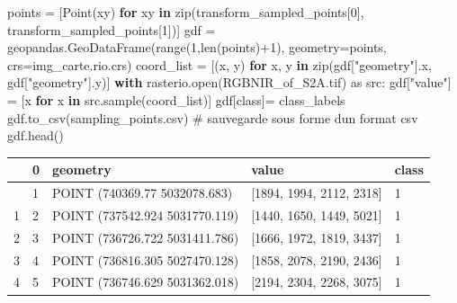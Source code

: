 \documentclass[
  french,
  11pt,
  letterpaper,
  open=any,
  twoside=false,
  french]{scrbook}
\newenvironment{Shaded}{\begin{snugshade}}{\end{snugshade}}
\newcommand{\BuiltInTok}[1]{\textcolor[rgb]{0.00,0.23,0.31}{#1}}
\newcommand{\CommentTok}[1]{\textcolor[rgb]{0.37,0.37,0.37}{#1}}
\newcommand{\ControlFlowTok}[1]{\textcolor[rgb]{0.00,0.23,0.31}{\textbf{#1}}}
\newcommand{\DecValTok}[1]{\textcolor[rgb]{0.68,0.00,0.00}{#1}}
\newcommand{\ImportTok}[1]{\textcolor[rgb]{0.00,0.46,0.62}{#1}}
\newcommand{\KeywordTok}[1]{\textcolor[rgb]{0.00,0.23,0.31}{\textbf{#1}}}
\newcommand{\NormalTok}[1]{\textcolor[rgb]{0.00,0.23,0.31}{#1}}
\newcommand{\OperatorTok}[1]{\textcolor[rgb]{0.37,0.37,0.37}{#1}}
\newcommand{\StringTok}[1]{\textcolor[rgb]{0.13,0.47,0.30}{#1}}
\newcounter{none} %
\begin{document}
\begin{Shaded}
\begin{Highlighting}[]
\NormalTok{points }\OperatorTok{=}\NormalTok{ [Point(xy) }\ControlFlowTok{for}\NormalTok{ xy }\KeywordTok{in} \BuiltInTok{zip}\NormalTok{(transform\_sampled\_points[}\DecValTok{0}\NormalTok{], transform\_sampled\_points[}\DecValTok{1}\NormalTok{])]}
\NormalTok{gdf }\OperatorTok{=}\NormalTok{ geopandas.GeoDataFrame(}\BuiltInTok{range}\NormalTok{(}\DecValTok{1}\NormalTok{,}\BuiltInTok{len}\NormalTok{(points)}\OperatorTok{+}\DecValTok{1}\NormalTok{), geometry}\OperatorTok{=}\NormalTok{points, crs}\OperatorTok{=}\NormalTok{img\_carte.rio.crs)}
\NormalTok{coord\_list }\OperatorTok{=}\NormalTok{ [(x, y) }\ControlFlowTok{for}\NormalTok{ x, y }\KeywordTok{in} \BuiltInTok{zip}\NormalTok{(gdf[}\StringTok{"geometry"}\NormalTok{].x, gdf[}\StringTok{"geometry"}\NormalTok{].y)]}
\ControlFlowTok{with}\NormalTok{ rasterio.}\BuiltInTok{open}\NormalTok{(}\StringTok{\textquotesingle{}RGBNIR\_of\_S2A.tif\textquotesingle{}}\NormalTok{) }\ImportTok{as}\NormalTok{ src:}
\NormalTok{  gdf[}\StringTok{"value"}\NormalTok{] }\OperatorTok{=}\NormalTok{ [x }\ControlFlowTok{for}\NormalTok{ x }\KeywordTok{in}\NormalTok{ src.sample(coord\_list)]}
\NormalTok{gdf[}\StringTok{\textquotesingle{}class\textquotesingle{}}\NormalTok{]}\OperatorTok{=}\NormalTok{ class\_labels}
\NormalTok{gdf.to\_csv(}\StringTok{\textquotesingle{}sampling\_points.csv\textquotesingle{}}\NormalTok{) }\CommentTok{\# sauvegarde sous forme d\textquotesingle{}un format csv}
\NormalTok{gdf.head()}
\end{Highlighting}
\end{Shaded}

{\def\LTcaptype{none} %
\begin{longtable}[]{@{}lllll@{}}
\toprule\noalign{}
& 0 & geometry & value & class \\
\midrule\noalign{}
\endhead
\bottomrule\noalign{}
\endlastfoot
0 & 1 & POINT (740369.77 5032078.683) & {[}1894, 1994, 2112, 2318{]} &
1 \\
1 & 2 & POINT (737542.924 5031770.119) & {[}1440, 1650, 1449, 5021{]} &
1 \\
2 & 3 & POINT (736726.722 5031411.786) & {[}1666, 1972, 1819, 3437{]} &
1 \\
3 & 4 & POINT (736816.305 5027470.128) & {[}1858, 2078, 2190, 2436{]} &
1 \\
4 & 5 & POINT (736746.629 5031362.018) & {[}2194, 2304, 2268, 3075{]} &
1 \\
\end{longtable}
}
\end{document}
